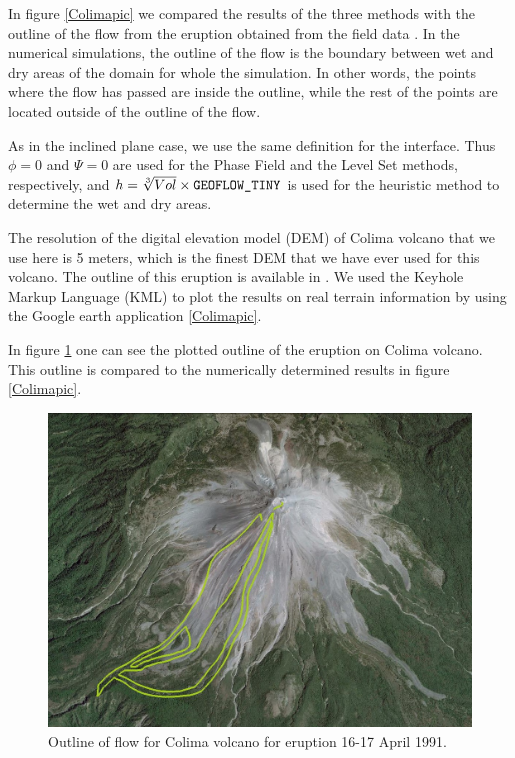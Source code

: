 \documentclass[review]{elsarticle}
\begin{document}
In figure \ref{Colimapic} we compared the results of the three methods with the outline of the flow from the eruption obtained from the field data \cite{Rupp2006}. 
In the numerical simulations, the outline of the flow is the boundary between wet and dry areas of the domain for whole the simulation. In other words, the points where the flow has
passed are inside the outline, while the rest of the points are located outside of the outline of the flow. 

As in the inclined plane case, we use the same definition for the interface.
Thus $\phi=0$ and $\varPsi=0$ are used for the Phase Field and the Level Set methods, respectively, and $h=\sqrt[3]{Vol} \times {\rm\verb1GEOFLOW_TINY1} $ 
is used for the heuristic method to determine the wet and dry areas.
 
The resolution of the digital elevation model (DEM) of Colima volcano that we use here is 5 meters, which is the finest DEM 
that we have ever used for this volcano.
The outline of this eruption is available in \cite{NamikawaPhD}.
We used the Keyhole Markup Language (KML) to plot the results on real terrain information by using the Google earth application \ref{Colimapic}. 

In figure \ref{colima_outline} one can see the plotted outline of the eruption on Colima volcano. 
This outline is compared to the numerically determined results in figure \ref{Colimapic}.

\begin{figure}[H]
\centering
\includegraphics[width=.5\textwidth]{IMAGES/outline1.jpg}
\caption{Outline of flow for Colima volcano for eruption 16-17 April 1991.}
 \label{colima_outline}

\end{figure}
\end{document}
